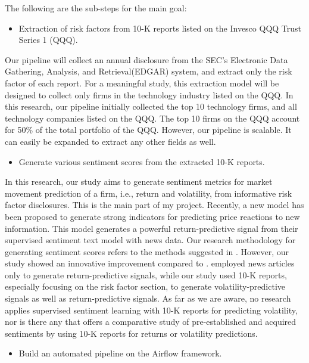 \documentclass[logo,bsc,singlespacing,parskip]{infthesis}
\begin{document}
The following are the sub-steps for the main goal:

\begin{itemize}
    \item Extraction of risk factors from 10-K reports listed on the Invesco QQQ Trust Series 1 (QQQ).
\end{itemize}

Our pipeline will collect an annual disclosure from the SEC’s Electronic Data Gathering, Analysis, and Retrieval(EDGAR) system, and extract only the risk factor of each report. For a meaningful study, this extraction model will be designed to collect only firms in the technology industry listed on the QQQ. In this research, our pipeline initially collected the top 10 technology firms, and all technology companies listed on the QQQ. The top 10 firms on the QQQ account for 50\% of the total portfolio of the QQQ. However, our pipeline is scalable. It can easily be expanded to extract any other fields as well.

\begin{itemize}
    \item Generate various sentiment scores from the extracted 10-K reports.
\end{itemize}

In this research, our study aims to generate sentiment metrics for market movement prediction of a firm, i.e., return and volatility, from informative risk factor disclosures. This is the main part of my project. Recently, a new model has been proposed to generate strong indicators for predicting price reactions to new information. This model \cite{ke2020predicting} generates a powerful return-predictive signal from their supervised sentiment text model with news data. Our research methodology for generating sentiment scores refers to the methods suggested in \cite{ke2020predicting}. However, our study showed an innovative improvement compared to \cite{ke2020predicting}.  \cite{ke2020predicting} employed news articles only to generate return-predictive signals, while our study used 10-K reports, especially focusing on the risk factor section, to generate volatility-predictive signals as well as return-predictive signals. As far as we are aware, no research applies supervised sentiment learning with 10-K reports for predicting volatility, nor is there any that offers a comparative study of pre-established and acquired sentiments by using 10-K reports for returns or volatility predictions.

\begin{itemize}
    \item Build an automated pipeline on the Airflow framework.
\end{itemize}
\end{document}
